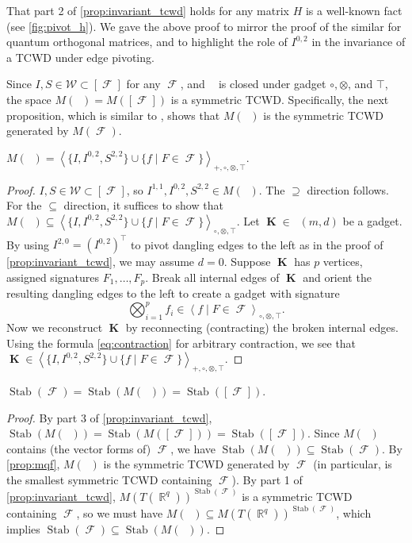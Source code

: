 \documentclass{article}
\DeclareMathOperator{\rr}{\mathbb{R}}
\DeclareMathOperator{\vk}{\mathbf{K}}
\DeclareMathOperator{\fc}{\mathcal{F}}
\DeclareMathOperator{\gk}{\mathfrak{G}_{\mathcal{F}}}
\DeclareMathOperator{\qk}{\mathfrak{Q}_{\mathcal{F}}}
\DeclareMathOperator{\stab}{Stab}
\newcommand{\tcwd}[1]{\left\langle #1 \right\rangle_{+, \circ, \otimes ,\top}}
\newcommand{\tcwdn}[1]{\left\langle #1 \right\rangle_{\circ, \otimes ,\top}}
\begin{document}
That part 2 of \autoref{prop:invariant_tcwd} holds for any matrix $H$
is a well-known fact (see \autoref{fig:pivot_h}). We gave the above
proof to mirror the proof of the similar \cite[Lemma 6]{cai_planar_2023} for quantum
orthogonal matrices, and to highlight the role of $I^{0,2}$ 
in the invariance of a TCWD under edge pivoting.

Since $I,S \in \mathcal{W} \subset [\fc]$ for any $\fc$, and $\gk$ is closed under gadget 
$\circ,\otimes$, and $\top$, the space $M(\qk) = M([\fc])$ is a symmetric TCWD. Specifically,
the next proposition, which is similar to \cite[Theorem 3]{young2022equality}, shows that $M(\qk)$ is the symmetric TCWD generated by $M(\fc)$.
\begin{proposition}
    $M(\qk) = \tcwd{\big\{I,I^{0,2},S^{2,2}\big\} \cup \big\{f \mid F \in \fc\big\}}$.
    \label{prop:mqf}
\end{proposition}
\begin{proof}
    $I, S\in \mathcal{W} \subset [\fc]$, so $I^{1,1},I^{0,2},S^{2,2} \in M(\qk)$.
    The $\supseteq$ direction follows. For the $\subseteq$ direction, it suffices to show
    that $M(\gk) \subseteq \tcwdn{\big\{I,I^{0,2},S^{2,2}\big\} \cup \big\{f \mid F \in \fc\big\}}$.
    Let $\vk \in \gk(m,d)$ be a gadget. By using $I^{2,0} = (I^{0,2})^\top$ to pivot dangling edges to the
    left as in the proof of \autoref{prop:invariant_tcwd}, we may assume $d = 0$.
    Suppose $\vk$ has $p$ vertices, assigned signatures $F_1,\ldots,F_{p}$.
    Break all internal edges of $\vk$ and orient the resulting dangling edges to the left 
    to create a gadget with signature
    \begin{equation}
        \bigotimes_{i=1}^{p} f_i \in \tcwdn{f \mid F \in \fc}.
        \label{eq:biggadget}
    \end{equation}
    Now we reconstruct $\vk$ by reconnecting (contracting) the broken internal edges. 
    Using the formula \eqref{eq:contraction} for arbitrary contraction, we see that
    $\vk \in \tcwd{\big\{I,I^{0,2},S^{2,2}\big\} \cup \big\{f \mid F \in \fc\big\}}$.
\end{proof}

\begin{proposition}
    \label{prop:stabfc}
    $\stab(\fc) = \stab(M(\qk)) = \stab([\fc])$.
\end{proposition}
\begin{proof}
    By part 3 of \autoref{prop:invariant_tcwd}, $\stab(M(\qk)) = \stab(M([\fc])) = \stab([\fc])$.
    Since $M(\qk)$ contains (the vector forms of) $\fc$, we have
    $\stab(M(\qk)) \subseteq \stab(\fc)$. By \autoref{prop:mqf}, 
    $M(\qk)$ is the symmetric TCWD generated by $\fc$ (in particular, is the smallest symmetric
    TCWD containing $\fc$).
    By part 1 of \autoref{prop:invariant_tcwd}, $M(T(\rr^q))^{\stab(\fc)}$ is a symmetric TCWD
    containing $\fc$, so we must have $M(\qk) \subseteq M(T(\rr^q))^{\stab(\fc)}$, which implies
    $\stab(\fc) \subseteq \stab(M(\qk))$.
\end{proof}
\end{document}
